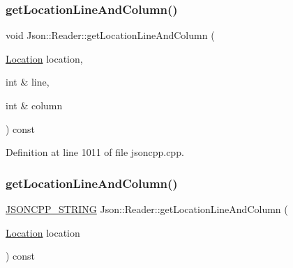\hypertarget{class_json_1_1_reader_a8b2fb6af24382c3914fd4643b092c675}{}\label{class_json_1_1_reader_a8b2fb6af24382c3914fd4643b092c675} 
\subsubsection{\texorpdfstring{get\+Location\+Line\+And\+Column()}{getLocationLineAndColumn()}\hspace{0.1cm}{\footnotesize\ttfamily [3/4]}}
{\footnotesize\ttfamily void Json\+::\+Reader\+::get\+Location\+Line\+And\+Column (\begin{DoxyParamCaption}\item[{\hyperlink{class_json_1_1_reader_a46795b5b272bf79a7730e406cb96375a}{Location}}]{location,  }\item[{int \&}]{line,  }\item[{int \&}]{column }\end{DoxyParamCaption}) const\hspace{0.3cm}{\ttfamily [private]}}



Definition at line 1011 of file jsoncpp.\+cpp.

\hypertarget{class_json_1_1_reader_a49757dec5a1a53eff388dc7bf2bda890}{}\label{class_json_1_1_reader_a49757dec5a1a53eff388dc7bf2bda890} 
\subsubsection{\texorpdfstring{get\+Location\+Line\+And\+Column()}{getLocationLineAndColumn()}\hspace{0.1cm}{\footnotesize\ttfamily [4/4]}}
{\footnotesize\ttfamily \hyperlink{config_8h_a1e723f95759de062585bc4a8fd3fa4be}{J\+S\+O\+N\+C\+P\+P\+\_\+\+S\+T\+R\+I\+NG} Json\+::\+Reader\+::get\+Location\+Line\+And\+Column (\begin{DoxyParamCaption}\item[{\hyperlink{class_json_1_1_reader_a46795b5b272bf79a7730e406cb96375a}{Location}}]{location }\end{DoxyParamCaption}) const\hspace{0.3cm}{\ttfamily [private]}}



